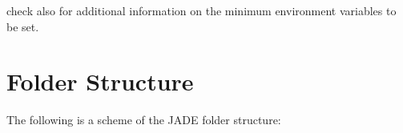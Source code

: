 \documentclass[letterpaper,10pt,english]{sphinxmanual}
\begin{document}


check also {\hyperref[\detokenize{usage/configuration:mainconfig}]{}} for additional information on the minimum environment variables
to be set.




\chapter{Folder Structure}
\label{\detokenize{usage/folders:folder-structure}}\label{\detokenize{usage/folders:folders}}\label{\detokenize{usage/folders::doc}}
The following is a scheme of the JADE folder structure:

\begin{sphinxVerbatim}[commandchars=\\\{\}]
      
                 
                 
                 
                 
                 
     
                 
                 
                 

\end{sphinxVerbatim}
\end{document}
